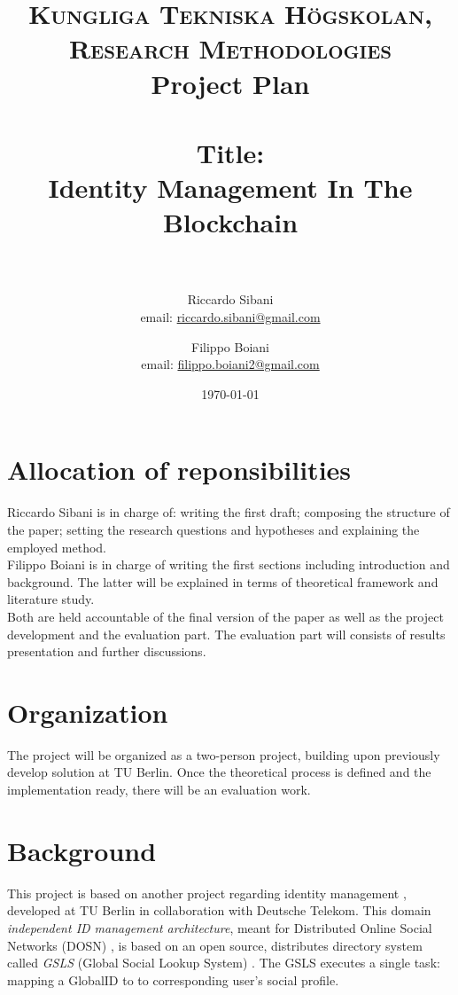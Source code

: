 \documentclass[paper=a4, fontsize=11pt]{scrartcl} %
\title{
\normalfont \normalsize
\textsc{Kungliga Tekniska Högskolan, Research Methodologies} \\ [10pt] %
Project Plan \\ [16pt]
\horrule{0.5pt} \\[0.5pt] %
\huge Title:\\Identity Management In The Blockchain \\ %
\vspace{5mm}
\horrule{1pt} \\[0.5cm] %
}
\author{Riccardo Sibani \\ email: \href{mailto:riccardo.sibani@gmail.com}{riccardo.sibani@gmail.com}
   \and Filippo Boiani \\ email: \href{mailto:filippo.boiani2@gmail.com}{filippo.boiani2@gmail.com} } %
\date{\normalsize\today} %
\numberwithin{equation}{section} %
\numberwithin{figure}{section} %
\numberwithin{table}{section} %
\begin{document}
\maketitle %


\section{Allocation of reponsibilities}
Riccardo Sibani is in charge of: writing the first draft; composing the structure of the paper; setting the research questions and hypotheses and explaining the employed method.
\\

Filippo Boiani is in charge of writing the first sections including introduction and background. The latter will be explained in terms of theoretical framework and literature study. 
\\

Both are held accountable of the final version of the paper as well as the project development and the evaluation part. The evaluation part will consists of results presentation and further discussions. 

\section{Organization}
The project will be organized as a two-person project, building upon previously develop solution at TU Berlin. Once the theoretical process is defined and the implementation ready, there will be an evaluation work.

\section{Background}
This project is based on another project regarding identity management \cite{identityMgmt2003} \cite{gondor2016distributed}, developed at TU Berlin in collaboration with Deutsche Telekom. This domain \textit{independent ID management architecture}, meant for Distributed Online Social Networks (DOSN) \cite{gondor2014sonic}, is based on an open source, distributes directory system called \textit{GSLS} (Global Social Lookup System) \cite{gondor2016distributed}. The GSLS executes a single task: mapping a GlobalID to to corresponding user's social profile. 
\end{document}
